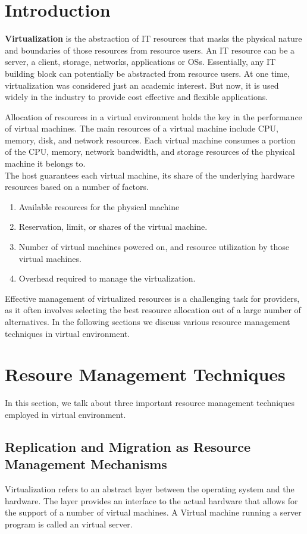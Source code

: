 \documentclass[conference]{IEEEtran}
\begin{document}
\section{Introduction}


\textbf{Virtualization} is the abstraction of IT resources that masks the physical nature and boundaries of those resources from resource users. An IT resource can be a server, a client, storage, networks, applications or OSs. Essentially, any IT building block can potentially be abstracted from resource users. At one time, virtualization was considered just an academic interest. But now, it is used widely in the industry to provide cost effective and flexible applications. 


Allocation of resources in a virtual environment holds the key in the performance of virtual machines. The main  resources of a virtual machine include CPU, memory, disk, and network resources. Each virtual machine consumes a portion of the CPU, memory, network bandwidth, and storage resources of the physical machine it belongs to.\\
The host guarantees each virtual machine, its share of the underlying hardware resources based on a number of factors.
\begin{enumerate}
\item{Available resources for the physical machine}
\item{Reservation, limit, or shares of the virtual machine.}
\item{Number of virtual machines powered on, and resource utilization by those virtual
machines.}
\item{Overhead required to manage the virtualization.}
\end{enumerate}
Effective management of virtualized resources is a challenging task for providers, as it often involves selecting the best resource allocation out of a large number of alternatives. In the following sections we discuss various resource management techniques in virtual environment.



\section{Resoure Management Techniques}
In this section, we talk about three important resource management techniques employed in virtual environment.
\subsection{Replication and Migration as Resource Management Mechanisms}
Virtualization refers to an abstract layer between the operating system and the hardware. The layer provides an interface to the actual hardware that allows for the support of a number of virtual machines. A Virtual machine running a server program is called an virtual server.\\
\end{document}
